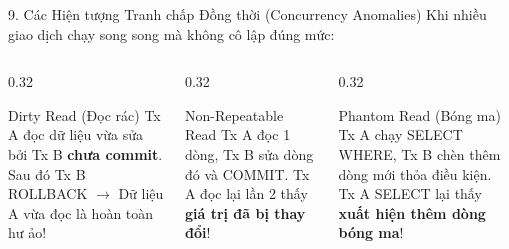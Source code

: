 \documentclass[aspectratio=169,11pt]{beamer}
\begin{document}
\begin{frame}{9. Các Hiện tượng Tranh chấp Đồng thời (Concurrency Anomalies)}
  Khi nhiều giao dịch chạy song song mà không cô lập đúng mức:
  \begin{columns}[T]
    \begin{column}{0.32\textwidth}
      \begin{block}{Dirty Read (Đọc rác)}
        Tx A đọc dữ liệu vừa sửa bởi Tx B \textbf{chưa commit}. Sau đó Tx B ROLLBACK $\rightarrow$ Dữ liệu A vừa đọc là hoàn toàn hư ảo!
      \end{block}
    \end{column}
    \begin{column}{0.32\textwidth}
      \begin{block}{Non-Repeatable Read}
        Tx A đọc 1 dòng, Tx B sửa dòng đó và COMMIT. Tx A đọc lại lần 2 thấy \textbf{giá trị đã bị thay đổi}!
      \end{block}
    \end{column}
    \begin{column}{0.32\textwidth}
      \begin{block}{Phantom Read (Bóng ma)}
        Tx A chạy SELECT WHERE, Tx B chèn thêm dòng mới thỏa điều kiện. Tx A SELECT lại thấy \textbf{xuất hiện thêm dòng bóng ma}!
      \end{block}
    \end{column}
  \end{columns}
\end{frame}
\end{document}
